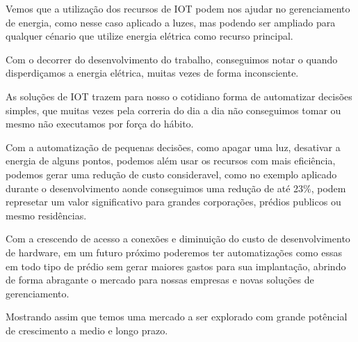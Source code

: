 \documentclass[openright]{normas-utf-tex} %
\begin{document}
Vemos que a utilização dos recursos de IOT podem nos ajudar no gerenciamento de energia, como nesse caso aplicado a luzes, mas podendo ser ampliado para qualquer cénario que utilize energia elétrica como recurso principal.

Com o decorrer do desenvolvimento do trabalho, conseguimos notar o quando disperdiçamos a energia elétrica, muitas vezes de forma inconsciente.   

As soluções de IOT trazem para nosso o cotidiano forma de automatizar decisões simples, que muitas vezes pela correria do dia a dia não conseguimos tomar ou mesmo não executamos por força do hábito. 

Com a automatização de pequenas decisões, como apagar uma luz, desativar a energia de alguns pontos, podemos além usar os recursos com mais eficiência, podemos gerar uma redução de custo consideravel, como no exemplo aplicado durante o desenvolvimento aonde conseguimos uma redução de até 23\%, podem represetar um valor significativo para grandes corporações, prédios publicos ou mesmo residências.

Com a crescendo de acesso a conexões e diminuição do custo de desenvolvimento de hardware, em um futuro próximo poderemos ter automatizações como essas em todo tipo de prédio sem gerar maiores gastos para sua implantação, abrindo de forma abragante o mercado para nossas empresas e novas soluções de gerenciamento.

Mostrando assim que temos uma mercado a ser explorado com grande potêncial de crescimento a medio e longo prazo.

\label{bibstart}
\label{bibend}

%
%
%
%
\end{document}

